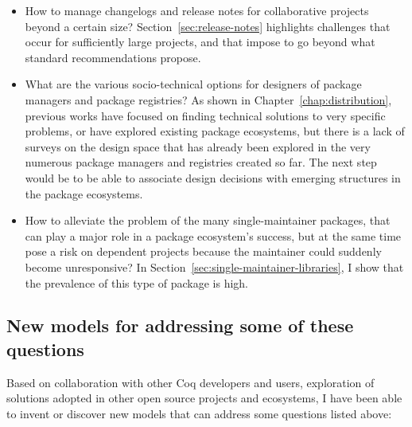\begin{itemize}
	\item How to manage changelogs and release notes for collaborative projects beyond a certain size? Section~\ref{sec:release-notes} highlights challenges that occur for sufficiently large projects, and that impose to go beyond what standard recommendations propose.
	\item What are the various socio-technical options for designers of package managers and package registries? As shown in Chapter~\ref{chap:distribution}, previous works have focused on finding technical solutions to very specific problems, or have explored existing package ecosystems, but there is a lack of surveys on the design space that has already been explored in the very numerous package managers and registries created so far. The next step would be to be able to associate design decisions with emerging structures in the package ecosystems.
	\item How to alleviate the problem of the many single-maintainer packages, that can play a major role in a package ecosystem's success, but at the same time pose a risk on dependent projects because the maintainer could suddenly become unresponsive? In Section~\ref{sec:single-maintainer-libraries}, I show that the prevalence of this type of package is high.
\end{itemize}

\subsection{New models for addressing some of these questions}

Based on collaboration with other Coq developers and users, exploration of solutions adopted in other open source projects and ecosystems, I have been able to invent or discover new models that can address some questions listed above:

